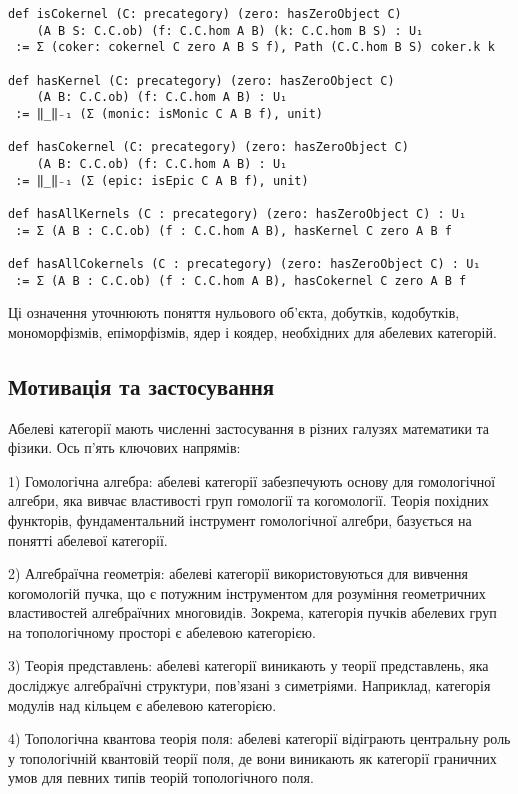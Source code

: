 \documentclass{article}
\begin{document}
\begin{lstlisting}
def isCokernel (C: precategory) (zero: hasZeroObject C)
    (A B S: C.C.ob) (f: C.C.hom A B) (k: C.C.hom B S) : U₁
 := Σ (coker: cokernel C zero A B S f), Path (C.C.hom B S) coker.k k

def hasKernel (C: precategory) (zero: hasZeroObject C)
    (A B: C.C.ob) (f: C.C.hom A B) : U₁
 := ‖_‖₋₁ (Σ (monic: isMonic C A B f), unit)

def hasCokernel (C: precategory) (zero: hasZeroObject C)
    (A B: C.C.ob) (f: C.C.hom A B) : U₁
 := ‖_‖₋₁ (Σ (epic: isEpic C A B f), unit)

def hasAllKernels (C : precategory) (zero: hasZeroObject C) : U₁
 := Σ (A B : C.C.ob) (f : C.C.hom A B), hasKernel C zero A B f

def hasAllCokernels (C : precategory) (zero: hasZeroObject C) : U₁
 := Σ (A B : C.C.ob) (f : C.C.hom A B), hasCokernel C zero A B f
\end{lstlisting}

Ці означення уточнюють поняття нульового об’єкта, добутків, кодобутків, мономорфізмів, епіморфізмів, ядер і коядер, необхідних для абелевих категорій.

\subsection{Мотивація та застосування}
Абелеві категорії мають численні застосування в різних галузях математики та фізики. Ось п’ять ключових напрямів:

1) Гомологічна алгебра: абелеві категорії забезпечують основу для гомологічної алгебри, яка вивчає властивості груп гомології та когомології. Теорія похідних функторів, фундаментальний інструмент гомологічної алгебри, базується на понятті абелевої категорії.

2) Алгебраїчна геометрія: абелеві категорії використовуються для вивчення когомологій пучка, що є потужним інструментом для розуміння геометричних властивостей алгебраїчних многовидів. Зокрема, категорія пучків абелевих груп на топологічному просторі є абелевою категорією.

3) Теорія представлень: абелеві категорії виникають у теорії представлень, яка досліджує алгебраїчні структури, пов’язані з симетріями. Наприклад, категорія модулів над кільцем є абелевою категорією.

4) Топологічна квантова теорія поля: абелеві категорії відіграють центральну роль у топологічній квантовій теорії поля, де вони виникають як категорії граничних умов для певних типів теорій топологічного поля.
\end{document}
